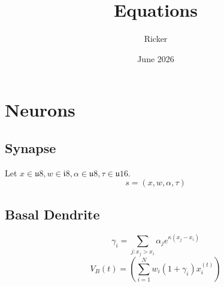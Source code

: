 \documentclass[11pt, a4paper]{article}
\title{Equations}
\author{ Ricker }
\date{June 2026}
\begin{document}
\section{Neurons}

\subsection{Synapse}
Let $x \in \mathfrak{u}8, w \in \mathfrak{i}8, \alpha \in \mathfrak{u}8, \tau \in \mathfrak{u}16$.
\begin{equation}
    s = (x,w,\alpha,\tau)
\end{equation}

\subsection{Basal Dendrite}
\begin{equation}
    \gamma_i = \sum_{j: x_j > x_i} \alpha_j e^{\kappa (x_j -x_i)}
\end{equation}
\begin{equation}
    V_B(t) = \left( \sum_{i=1}^N w_i(1+\gamma_i) x_i^{(t)} \right)
\end{equation}
\end{document}
